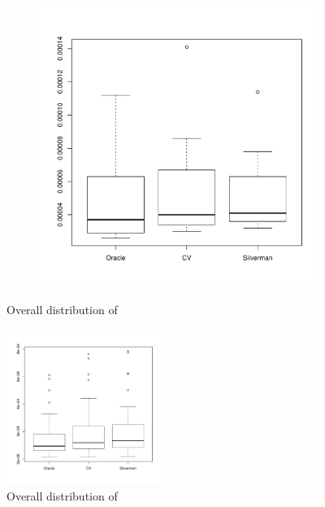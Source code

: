 \begin{figure}[htbp]
\begin{subfigure}[t]{0.45\textwidth}
        \includegraphics[width=\textwidth]{results/by_overall/normalized-miae-peakpop-boxplot}
        \label{fig:discussion:overall_nmiae_boxplot:peak}
    \end{subfigure}
    \caption{Overall distribution of }
    \label{fig:discussion:overall_nmiae_boxplot}
\end{figure}

\begin{figure}[htbp]
  \centering
  \includegraphics[width=0.45\textwidth]{results/by_overall/normalized-sup-error-boxplot}
  \caption{Overall distribution of }
  \label{fig:discussion:overall_nsup_boxplot}
\end{figure}


